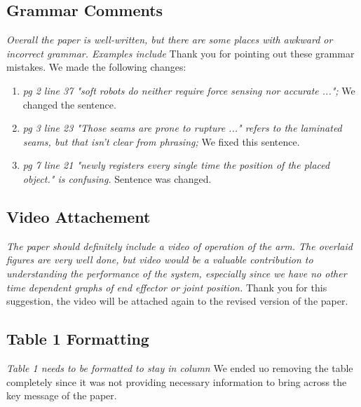 \documentclass[letterpaper, 10 pt, twocolumn, conference]{article}
\begin{document}
\subsection{Grammar Comments}
\textit{Overall the paper is well-written, but there are some places with awkward or incorrect grammar. 
Examples include}
Thank you for pointing out these grammar mistakes. We made the following changes:
\begin{enumerate}
\item \textit{pg 2 line 37 "soft robots do neither require force sensing nor accurate ...";}
%
We changed the sentence.
%
\item \textit{pg 3 line 23 "Those seams are prone to rupture ..." refers to the laminated seams, but that isn't clear from phrasing;}
%
We fixed this sentence.
%
\item \textit{pg 7 line 21 "newly registers every single time the position of the placed object." is confusing.}
%
Sentence was changed.
%
\end{enumerate}
%
\subsection{Video Attachement}
\textit{The paper should definitely include a video of operation of the arm. The overlaid figures are very well done, but video would be a valuable contribution to understanding the performance of the system, especially since we have no other time dependent graphs of end effector or joint position.}
%
Thank you for this suggestion, the video will be attached again to the revised version of the paper.
%
\subsection{Table 1 Formatting}
\textit{Table 1 needs to be formatted to stay in column}
%
We ended uo removing the table completely since it was not providing necessary information to bring across the key message of the paper.
%
\end{document}
